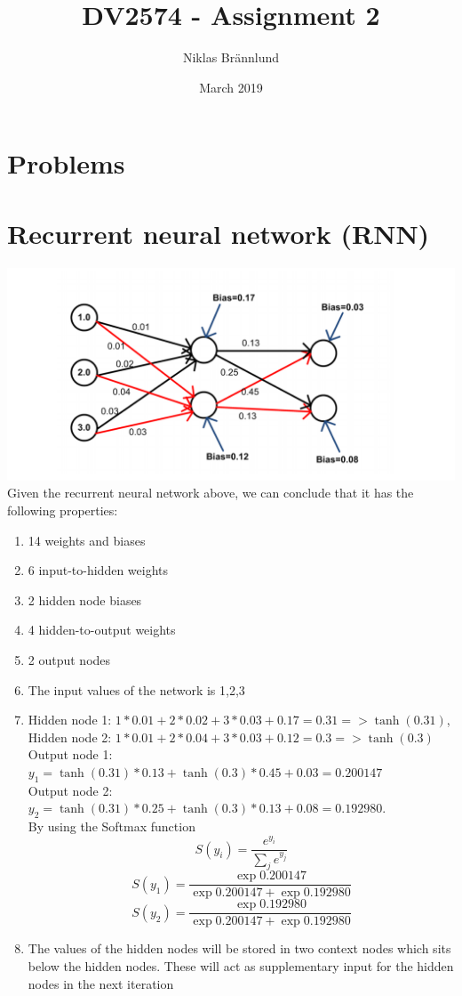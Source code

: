 \documentclass{article}
\title{DV2574 - Assignment 2}
\author{Niklas Brännlund}
\date{March 2019}
\begin{document}
\maketitle

\section*{Problems}
    \section{Recurrent neural network (RNN)}

    \includegraphics[width=\textwidth]{nn}
    Given the recurrent neural network above, we can conclude that it has the following properties:
    \begin{enumerate}[label=(\alph*)]
        \item 14 weights and biases
        \item 6 input-to-hidden weights
        \item 2 hidden node biases
        \item 4 hidden-to-output weights
        \item 2 output nodes 
        \item The input values of the network is 1,2,3
        \item Hidden node 1: $1*0.01 + 2*0.02 + 3*0.03 + 0.17 = 0.31 => \tanh(0.31)$, Hidden node 2: $1*0.01 + 2*0.04 + 3*0.03 + 0.12 = 0.3 => \tanh(0.3)$\\ Output node 1: $y_1 = \tanh(0.31) * 0.13 + \tanh(0.3)*0.45 + 0.03 = 0.200147$\\
        Output node 2: $y_2 = \tanh(0.31)*0.25 + \tanh(0.3)*0.13 + 0.08 = 0.192980$.\\ By using the Softmax function
        \begin{equation}
            S(y_i) = \frac{e^{y_i}}{\sum_j e^{y_j}}
        \end{equation}
        \begin{equation}
            S(y_1) = \frac{\exp{0.200147}}{\exp{0.200147} + \exp{0.192980}}
        \end{equation}
        \begin{equation}
            S(y_2) = \frac{\exp{0.192980}}{\exp{0.200147} + \exp{0.192980}}
        \end{equation}
        \item The values of the hidden nodes will be stored in two context nodes which sits below the hidden nodes. These will act as supplementary input for the hidden nodes in the next iteration  
    \end{enumerate}
\end{document}
